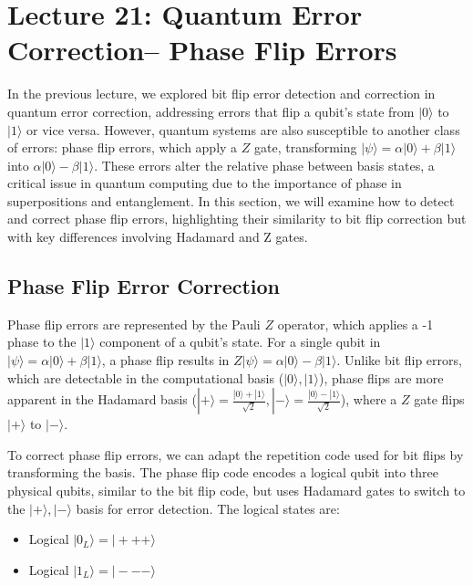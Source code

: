 \section{Lecture 21: Quantum Error Correction-- Phase Flip Errors} \label{sec:lecture21}

In the previous lecture, we explored bit flip error detection and correction
in quantum error correction, addressing errors that flip a qubit’s state from
\( |0\rangle \) to \( |1\rangle \) or vice versa. However, quantum systems
are also susceptible to another class of errors: phase flip errors, which
apply a \( Z \) gate, transforming \( |\psi\rangle = \alpha |0\rangle + \beta
|1\rangle \) into \( \alpha |0\rangle - \beta |1\rangle \). These errors
alter the relative phase between basis states, a critical issue in quantum
computing due to the importance of phase in superpositions and entanglement.
In this section, we will examine how to detect and correct phase flip errors,
highlighting their similarity to bit flip correction but with key differences
involving Hadamard and Z gates.

\subsection*{Phase Flip Error Correction}

Phase flip errors are represented by the Pauli \( Z \) operator, which
applies a -1 phase to the \( |1\rangle \) component of a qubit’s state. For a
single qubit in \( |\psi\rangle = \alpha |0\rangle + \beta |1\rangle \), a
phase flip results in \( Z |\psi\rangle = \alpha |0\rangle - \beta |1\rangle
\). Unlike bit flip errors, which are detectable in the computational basis
(\( |0\rangle, |1\rangle \)), phase flips are more apparent in the Hadamard
basis (\( |+\rangle = \frac{|0\rangle + |1\rangle}{\sqrt{2}}, |-\rangle =
\frac{|0\rangle - |1\rangle}{\sqrt{2}} \)), where a \( Z \) gate flips \(
|+\rangle \) to \( |-\rangle \).

To correct phase flip errors, we can adapt the repetition code used for bit
flips by transforming the basis. The phase flip code encodes a logical qubit
into three physical qubits, similar to the bit flip code, but uses Hadamard
gates to switch to the \( |+\rangle, |-\rangle \) basis for error detection.
The logical states are:
\begin{itemize}
  \item Logical \( |0_L\rangle = |+++\rangle \)
  \item Logical \( |1_L\rangle = |---\rangle \)
\end{itemize}

